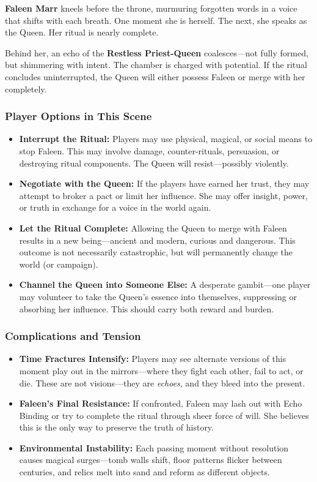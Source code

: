\textbf{Faleen Marr} kneels before the throne, murmuring forgotten words in a voice that shifts with each breath. One moment she is herself. The next, she speaks as the Queen. Her ritual is nearly complete.

Behind her, an echo of the \textbf{Restless Priest-Queen} coalesces—not fully formed, but shimmering with intent. The chamber is charged with potential. If the ritual concludes uninterrupted, the Queen will either possess Faleen or merge with her completely.

\subsubsection{Player Options in This Scene}
\begin{itemize}
  \item \textbf{Interrupt the Ritual:} Players may use physical, magical, or social means to stop Faleen. This may involve damage, counter-rituals, persuasion, or destroying ritual components. The Queen will resist—possibly violently.
  
  \item \textbf{Negotiate with the Queen:} If the players have earned her trust, they may attempt to broker a pact or limit her influence. She may offer insight, power, or truth in exchange for a voice in the world again.

  \item \textbf{Let the Ritual Complete:} Allowing the Queen to merge with Faleen results in a new being—ancient and modern, curious and dangerous. This outcome is not necessarily catastrophic, but will permanently change the world (or campaign).

  \item \textbf{Channel the Queen into Someone Else:} A desperate gambit—one player may volunteer to take the Queen’s essence into themselves, suppressing or absorbing her influence. This should carry both reward and burden.
\end{itemize}

\subsubsection{Complications and Tension}
\begin{itemize}
  \item \textbf{Time Fractures Intensify:} Players may see alternate versions of this moment play out in the mirrors—where they fight each other, fail to act, or die. These are not visions—they are \emph{echoes}, and they bleed into the present.
  
  \item \textbf{Faleen’s Final Resistance:} If confronted, Faleen may lash out with Echo Binding or try to complete the ritual through sheer force of will. She believes this is the only way to preserve the truth of history.
  
  \item \textbf{Environmental Instability:} Each passing moment without resolution causes magical surges—tomb walls shift, floor patterns flicker between centuries, and relics melt into sand and reform as different objects.
\end{itemize}

